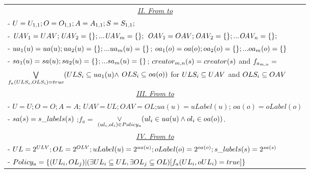 \begin{table}
\begin{tabular}{|l|}
 
	   \multicolumn{1}{|c|}{\underline{\textit{II. From \LPOneOne{} to \LPMN{}}}}\\	
			- $U = U_{1,1}; O = O_{1,1}; A = A_{1,1}; S = S_{1,1};$\\
			- $\textit{UAV}_{1} = UAV; \textit{UAV}_{2} = \{\}; ... \textit{UAV}_{m} = \{\};$  $\textit{OAV}_{1} = OAV; \textit{OAV}_{2} = \{\}; ... \textit{OAV}_{n} = \{\};$\\
			- $ua_{1}(u) = ua(u); ua_{2}(u) = \{\};...ua_{m}(u) = \{\}$; $oa_{1}(o) = oa(o); oa_{2}(o) = \{\};...oa_{m}(o) = \{\}$\\
		    - $sa_{1}(u) = sa(u); sa_{2}(u) = \{\};...sa_{m}(u) = \{\}$; $creator_{m,n}(s) = creator(s)$ and $f_{a_{m,n}} =$\\
		    $\mathop{\bigvee}\limits_{ f_{a}( ULS_{i},OLS_{i})=true }  (ULS_{i} \subseteq ua_{1}(u) \land$   $ OLS_{i}\subseteq oa(o))$  for $ULS_{i} \subseteq UAV$ and $OLS_{i} \subseteq OAV$ \\ 
		 	\multicolumn{1}{|c|}{\underline{\textit{III. From \EPOneOneModels{} to \LPOneOne{} }}}\\					
		 	- $U  = U ; O  = O ; A  = A $; $UAV	= UL; OAV = OL$;$ua(u) = uLabel(u)$; $oa(o)=oLabel(o) $\\
		 	-  $sa(s) = s\_labels(s) $ ;$f_a =$ $\mathop{\vee}\limits_{ (ul_i, ol_i) \in Policy_a} ( ul_i \in ua(u) \land ol_i \in oa(o))$. \\
		 	
		 	\multicolumn{1}{|c|}{\underline{\textit{IV. From \LPOneOne{} to \EPOneOneModels{}}}}\\	
		 	- $UL= 2^{ULV}; OL= 2^{OLV}; uLabel(u) = 2^{ua(u)};oLabel(o) = 2^{oa(o)}; s\_labels(s) = 2^{sa(s)}$ \\	  
		 	- $Policy_a = \{  (UL_i, OL_j) | (\exists UL_i \subseteq UL, \exists OL_j \subseteq OL)[ f_a(UL_i, oUL_i) = true] \} $
		 	
		 	\\ \hline	
	\end{tabular}	

	
\end{table}
